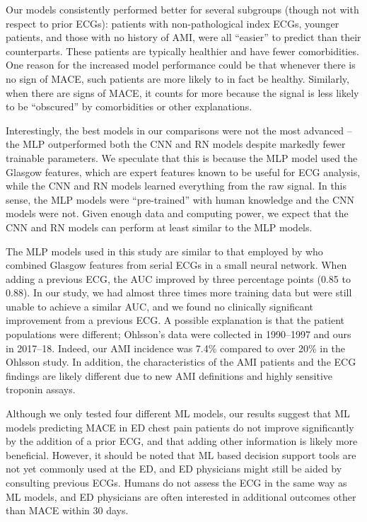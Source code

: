 \documentclass[preprint]{elsarticle}
\begin{document}
Our models consistently performed better for several subgroups (though not with respect to prior ECGs): patients with non-pathological index ECGs, younger patients, and those with no history of AMI, were all ``easier'' to predict than their counterparts. These patients are typically healthier and have fewer comorbidities. One reason for the increased model performance could be that whenever there is no sign of MACE, such patients are more likely to in fact be healthy. Similarly, when there are signs of MACE, it counts for more because the signal is less likely to be ``obscured'' by comorbidities or other explanations.

Interestingly, the best models in our comparisons were not the most advanced – the MLP outperformed both the CNN and RN models despite markedly fewer trainable parameters. We speculate that this is because the MLP model used the Glasgow features, which are expert features known to be useful for ECG analysis, while the CNN and RN models learned everything from the raw signal. In this sense, the MLP models were ``pre-trained'' with human knowledge and the CNN models were not. Given enough data and computing power, we expect that the CNN and RN models can perform at least similar to the MLP models.

The MLP models used in this study are similar to that employed by \citet{ohlsson2001} who combined Glasgow features from serial ECGs in a small neural network. When adding a previous ECG, the AUC improved by three percentage points (0.85 to 0.88). In our study, we had almost three times more training data but were still unable to achieve a similar AUC, and we found no clinically significant improvement from a previous ECG. A possible explanation is that the patient populations were different; Ohlsson's data were collected in 1990--1997 and ours in 2017--18. Indeed, our AMI incidence was 7.4\% compared to over 20\% in the Ohlsson study. In addition, the characteristics of the AMI patients and the ECG findings are likely different due to new AMI definitions and highly sensitive troponin assays. 

Although we only tested four different ML models, our results suggest that ML models predicting MACE in ED chest pain patients do not improve significantly by the addition of a prior ECG, and that adding other information is likely more beneficial. However, it should be noted that ML based decision support tools are not yet commonly used at the ED, and ED physicians might still be aided by consulting previous ECGs. Humans do not assess the ECG in the same way as ML models, and ED physicians are often interested in additional outcomes other than MACE within 30 days. 
\end{document}
